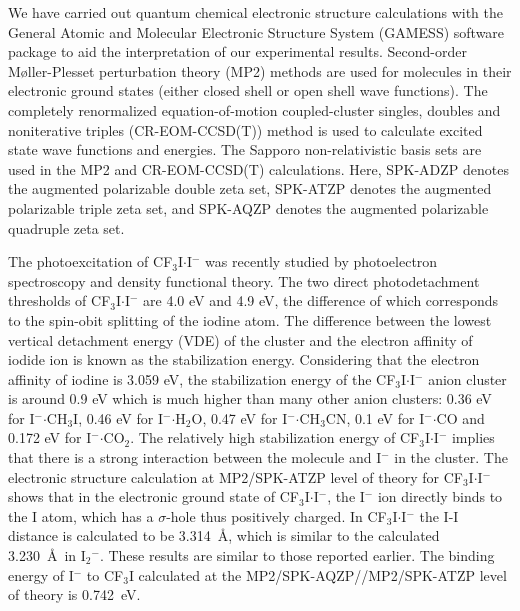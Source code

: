 \documentclass[%
aip,
rsi,
 amsmath,amssymb,
reprint,%
]{revtex4-1}
\begin{document}
We have carried out quantum chemical electronic structure calculations with the General Atomic and Molecular Electronic Structure System (GAMESS) software package\cite{barca2020recent} to aid the interpretation of our experimental results. Second-order Møller-Plesset perturbation theory (MP2)\cite{moller1934note,binkley1975moller} methods\cite{ishimura2006new,ishimura2007new,aikens2006scalable,fletcher2002gradient} are used for molecules in their electronic ground states (either closed shell or open shell wave functions). The completely renormalized equation-of-motion coupled-cluster singles, doubles and noniterative triples (CR-EOM-CCSD(T)) method\cite{piecuch2002efficient,piecuch2009left,kowalski2004new} is used to calculate excited state wave functions and energies. The Sapporo non-relativistic basis sets\cite{tatewaki1996contracted,tatewaki1997contracted,koga1999contracted,koga2002contracted} are used in the MP2 and CR-EOM-CCSD(T) calculations. Here, SPK-ADZP denotes the augmented polarizable double zeta set, SPK-ATZP denotes the augmented polarizable triple zeta set, and SPK-AQZP denotes the augmented polarizable quadruple zeta set.

The photoexcitation of CF$_3$I$\cdot$I$^-$ was recently studied by photoelectron spectroscopy and density functional theory\cite{mensa-bonsu_photoelectron_2019}. The two direct photodetachment thresholds of CF$_3$I$\cdot$I$^-$ are 4.0 eV and 4.9 eV\cite{mensa-bonsu_photoelectron_2019}, the difference of which corresponds to the spin-obit splitting of the iodine atom. The difference between the lowest vertical detachment energy (VDE) of the cluster and the electron affinity of iodide ion is known as the stabilization energy\cite{ayala2004study}. Considering that the electron affinity of iodine is 3.059 eV\cite{pelaez_pulsed_2009}, the stabilization energy of the CF$_3$I$\cdot$I$^-$ anion cluster is around 0.9 eV which is much higher than many other anion clusters: 0.36 eV for I$^-$$\cdot$CH$_3$I\cite{mabbs_photoelectron_2005}, 0.46 eV for I$^-$$\cdot$H$_2$O\cite{mabbs_photoelectron_2005}, 0.47 eV for I$^-$$\cdot$CH$_3$CN\cite{mabbs_photoelectron_2005}, 0.1 eV for I$^-$$\cdot$CO\cite{doi:10.1021/jp300471x} and 0.172 eV for I$^-$$\cdot$CO$_2$\cite{doi:10.1063/1.468576}. The relatively high stabilization energy of CF$_3$I$\cdot$I$^-$ implies that there is a strong interaction between the molecule and I$^-$ in the cluster. The electronic structure calculation at MP2/SPK-ATZP level of theory for CF$_3$I$\cdot$I$^-$ shows that in the electronic ground state of CF$_3$I$\cdot$I$^-$, the I$^-$ ion directly binds to the I atom, which has a $\sigma$-hole thus positively charged\cite{clark2007halogen}. In CF$_3$I$\cdot$I$^-$ the I-I distance is calculated to be 3.314~\AA, which is similar to the calculated 3.230~\AA~in {I$_2$}$^-$. These results are similar to those reported earlier\cite{mensa-bonsu_photoelectron_2019}. The binding energy of I$^-$ to CF$_3$I calculated at the MP2/SPK-AQZP//MP2/SPK-ATZP level of theory is 0.742~eV. 
\end{document}
